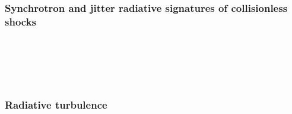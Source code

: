 \documentclass[usenatbib,twocolumn]{aastex63}
\begin{document}
\subsubsection{Synchrotron and jitter radiative signatures of collisionless shocks}
\citep{Medvedev_2009} \\
\citep{Sironi_2009} \\
\citep{Kirk_2010} \\
\citep{Nishikawa_2011} \\

\subsubsection{Radiative turbulence}
\citep{Zhdankin_2019}











\end{document}
